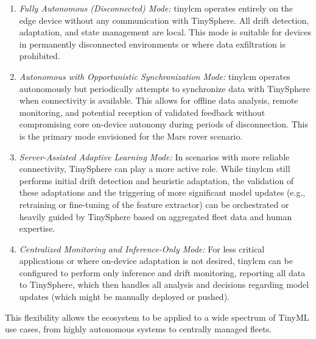 \begin{enumerate}[noitemsep, topsep=0pt]
    \item \textit{Fully Autonomous (Disconnected) Mode:} \gls{tinylcm} operates entirely on the edge device without any communication with TinySphere. All drift detection, adaptation, and state management are local. This mode is suitable for devices in permanently disconnected environments or where data exfiltration is prohibited.
    \item \textit{Autonomous with Opportunistic Synchronization Mode:} \gls{tinylcm} operates autonomously but periodically attempts to synchronize data with TinySphere when connectivity is available. This allows for offline data analysis, remote monitoring, and potential reception of validated feedback without compromising core on-device autonomy during periods of disconnection. This is the primary mode envisioned for the Mars rover scenario.
    \item \textit{Server-Assisted Adaptive Learning Mode:} In scenarios with more reliable connectivity, TinySphere can play a more active role. While \gls{tinylcm} still performs initial drift detection and heuristic adaptation, the validation of these adaptations and the triggering of more significant model updates (e.g., retraining or fine-tuning of the feature extractor) can be orchestrated or heavily guided by TinySphere based on aggregated fleet data and human expertise.
    \item \textit{Centralized Monitoring and Inference-Only Mode:} For less critical applications or where on-device adaptation is not desired, \gls{tinylcm} can be configured to perform only inference and drift monitoring, reporting all data to TinySphere, which then handles all analysis and decisions regarding model updates (which might be manually deployed or pushed).
\end{enumerate}
This flexibility allows the ecosystem to be applied to a wide spectrum of TinyML use cases, from highly autonomous systems to centrally managed fleets.
